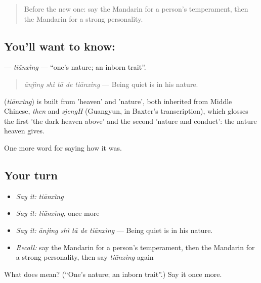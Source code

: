 \begin{quote}
Before the new one: say the Mandarin for a person's temperament, then the Mandarin for a strong personality.
\end{quote}

\subsection*{You'll want to know: }
\textbf{} — \emph{tiānxìng} — \textquotedblleft{}one's nature; an inborn trait\textquotedblright{}.

\begin{quote}
\textbf{} \emph{ānjìng shì tā de tiānxìng} — Being quiet is in his nature.
\end{quote}

\begin{cousinweb}
\textbf{} (\emph{tiānxìng}) is built from  'heaven' and  'nature', both inherited from Middle Chinese, \emph{then} and \emph{sjengH} (Guangyun, in Baxter's transcription), which glosses the first 'the dark heaven above' and the second 'nature and conduct': the nature heaven gives.
\end{cousinweb}

\begin{grammarlens}[title={What you've built}]
One more word for saying how it was.
\end{grammarlens}

\subsection*{Your turn}
\begin{itemize}
\raggedright
  \item \emph{Say it:} \emph{tiānxìng}
  \item \emph{Say it:} \emph{tiānxìng}, once more
  \item \emph{Say it:} \emph{ānjìng shì tā de tiānxìng} — Being quiet is in his nature.
  \item \emph{Recall:} say the Mandarin for a person's temperament, then the Mandarin for a strong personality, then say \emph{tiānxìng} again
\end{itemize}

\begin{tcolorbox}[breakable,colback=teal!4,colframe=teal!35!black,title={Before you move on}]
What does  mean? (\textquotedblleft{}One's nature; an inborn trait\textquotedblright{}.) Say it once more.
\end{tcolorbox}

